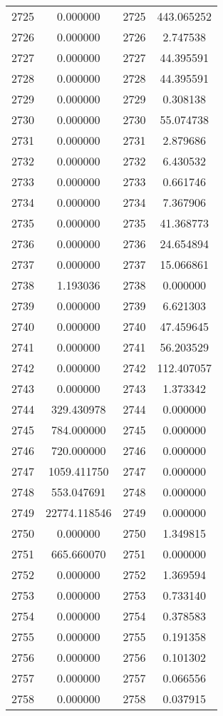 \documentclass[12pt]{article}
\begin{document}
\begin{longtable}{@{}cccc@{}}
2725 & 0.000000 & 2725 & 443.065252 \\
2726 & 0.000000 & 2726 & 2.747538 \\
2727 & 0.000000 & 2727 & 44.395591 \\
2728 & 0.000000 & 2728 & 44.395591 \\
2729 & 0.000000 & 2729 & 0.308138 \\
2730 & 0.000000 & 2730 & 55.074738 \\
2731 & 0.000000 & 2731 & 2.879686 \\
2732 & 0.000000 & 2732 & 6.430532 \\
2733 & 0.000000 & 2733 & 0.661746 \\
2734 & 0.000000 & 2734 & 7.367906 \\
2735 & 0.000000 & 2735 & 41.368773 \\
2736 & 0.000000 & 2736 & 24.654894 \\
2737 & 0.000000 & 2737 & 15.066861 \\
2738 & 1.193036 & 2738 & 0.000000 \\
2739 & 0.000000 & 2739 & 6.621303 \\
2740 & 0.000000 & 2740 & 47.459645 \\
2741 & 0.000000 & 2741 & 56.203529 \\
2742 & 0.000000 & 2742 & 112.407057 \\
2743 & 0.000000 & 2743 & 1.373342 \\
2744 & 329.430978 & 2744 & 0.000000 \\
2745 & 784.000000 & 2745 & 0.000000 \\
2746 & 720.000000 & 2746 & 0.000000 \\
2747 & 1059.411750 & 2747 & 0.000000 \\
2748 & 553.047691 & 2748 & 0.000000 \\
2749 & 22774.118546 & 2749 & 0.000000 \\
2750 & 0.000000 & 2750 & 1.349815 \\
2751 & 665.660070 & 2751 & 0.000000 \\
2752 & 0.000000 & 2752 & 1.369594 \\
2753 & 0.000000 & 2753 & 0.733140 \\
2754 & 0.000000 & 2754 & 0.378583 \\
2755 & 0.000000 & 2755 & 0.191358 \\
2756 & 0.000000 & 2756 & 0.101302 \\
2757 & 0.000000 & 2757 & 0.066556 \\
2758 & 0.000000 & 2758 & 0.037915 \\

\end{longtable}
\end{document}
